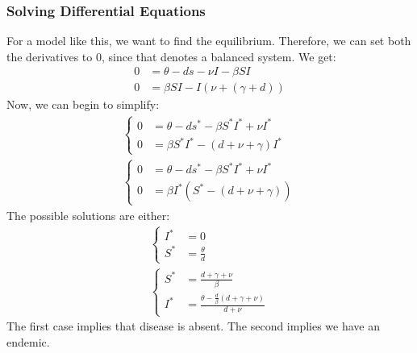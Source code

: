 \documentclass[10pt]{article}
\begin{document}
\subsubsection*{Solving Differential Equations}
For a model like this, we want to find the equilibrium.  Therefore, we can set both the derivatives to 0, since that denotes a balanced system.  We get:
\begin{align*}
    0 &= \theta - ds - \nu I - \beta SI \\
    0 &= \beta SI - I(\nu + (\gamma + d))
\end{align*}
Now, we can begin to simplify:
\begin{align*}
    \begin{cases}
        0 &= \theta - ds^* - \beta S^* I^* + \nu I^*\\
        0 &= \beta S^* I^* - (d + \nu + \gamma) I^*
    \end{cases}\\
    \begin{cases}
        0 &= \theta - ds^* - \beta S^* I^* + \nu I^*\\
        0 &= \beta I^* (S^* - (d + \nu + \gamma))
    \end{cases}
\end{align*}
The possible solutions are either:
\begin{align*}
    \begin{cases}
        I^* &= 0 \\
        S^* &= \frac{\theta}{d}
    \end{cases}\\
    \begin{cases}
        S^* &= \frac{d + \gamma + \nu}{\beta}\\
        I^* &= \frac{\theta - \frac{d}{\beta} (d + \gamma + \nu)}{d + \nu}
    \end{cases}
\end{align*}
The first case implies that disease is absent.  The second implies we have an endemic.
\end{document}
